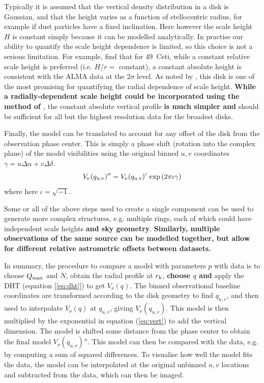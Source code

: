 \documentclass[fleqn,usenatbib]{mnras}
\begin{document}
Typically it is assumed that the vertical density distribution in a disk is Gaussian, and that the height varies as a function of stellocentric radius, for example if dust particles have a fixed inclination. Here however the scale height $H$ is constant simply because it can be modelled analytically. In practise our ability to quantify the scale height dependence is limited, so this choice is not a serious limitation. For example, \citet{2023MNRAS.524.1229T} find that for 49~Ceti, while a constant relative scale height is preferred (i.e. $H/r=$ constant), a constant absolute height is consistent with the ALMA data at the 2$\sigma$ level. As noted by \citet{2023MNRAS.524.1229T}, this disk is one of the most promising for quantifying the radial dependence of scale height. \textbf{While a radially-dependent scale height could be incorporated using the method of \citet{2023MNRAS.524.1229T}}, the constant absolute vertical profile \textbf{is much simpler and} should be sufficient for all but the highest resolution data for the broadest disks.

Finally, the model can be translated to account for any offset of the disk from the observation phase center. This is simply a phase shift (rotation into the complex plane) of the model visibilities using the original binned $u,v$ coordinates $\gamma = u \Delta \alpha + v \Delta \delta$.
\begin{equation}\label{eq:phase}
    V_\nu(q_{\rm u,v})'' = V_\nu(q_{\rm u,v})' \, \exp{(2 \pi \iota \gamma)}
\end{equation}
where here $\iota = \sqrt{-1}$.

Some or all of the above steps used to create a single component can be used to generate more complex structures, e.g. multiple rings, each of which could have independent scale heights \textbf{and sky geometry}. \textbf{Similarly, multiple observations of the same source can be modelled together, but allow for different relative astrometric offsets between datasets.}

In summary, the procedure to compare a model with parameters $p$ with data is to choose $Q_{\rm max}$ and $N$, obtain the radial profile at $r_{\rm k}$, \textbf{choose $q$ and} apply the DHT (equation [\ref{eq:dht}]) to get $V_\nu(q)$. The binned observational baseline coordinates are transformed according to the disk geometry to find $q_{u,v}$, and then used to interpolate $V_\nu(q)$ at $q_{u,v}$, giving $V_\nu(q_{u,v})$. This model is then multiplied by the exponential in equation (\ref{eq:vert}) to add the vertical dimension. The model is shifted some distance from the phase center to obtain the final model $V_\nu(q_{u,v})''$. This model can then be compared with the data, e.g. by computing a sum of squared differences. To visualise how well the model fits the data, the model can be interpolated at the original unbinned $u,v$ locations and subtracted from the data, which can then be imaged.
\end{document}
